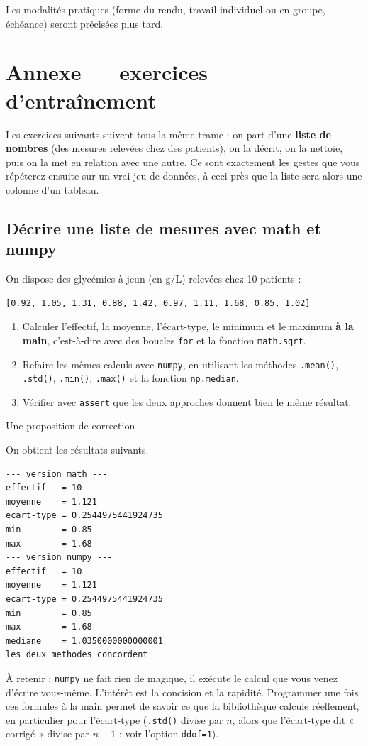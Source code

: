\documentclass[a4paper,12pt]{article}
\begin{document}
\begin{leftbar}
Les modalités pratiques (forme du rendu, travail individuel ou en groupe, échéance) seront précisées plus tard.
\end{leftbar}

\clearpage
\section{Annexe --- exercices d'entraînement}
Les exercices suivants suivent tous la même trame : on part d'une \textbf{liste de nombres} (des mesures relevées chez des patients), on la décrit, on la nettoie, puis on la met en relation avec une autre. Ce sont exactement les gestes que vous répéterez ensuite sur un vrai jeu de données, à ceci près que la liste sera alors une colonne d'un tableau.

\subsection{Décrire une liste de mesures avec math et numpy}
\begin{leftbar}
On dispose des glycémies à jeun (en g/L) relevées chez 10 patients :
\begin{verbatim}
[0.92, 1.05, 1.31, 0.88, 1.42, 0.97, 1.11, 1.68, 0.85, 1.02]
\end{verbatim}
\begin{enumerate}
\item Calculer l'effectif, la moyenne, l'écart-type, le minimum et le maximum \textbf{à la main}, c'est-à-dire avec des boucles \texttt{for} et la fonction \texttt{math.sqrt}.
\item Refaire les mêmes calculs avec \texttt{numpy}, en utilisant les méthodes \texttt{.mean()}, \texttt{.std()}, \texttt{.min()}, \texttt{.max()} et la fonction \texttt{np.median}.
\item Vérifier avec \texttt{assert} que les deux approches donnent bien le même résultat.
\end{enumerate}
\end{leftbar}
Une proposition de correction

On obtient les résultats suivants.
\begin{verbatim}
--- version math ---
effectif   = 10
moyenne    = 1.121
ecart-type = 0.2544975441924735
min        = 0.85
max        = 1.68
--- version numpy ---
effectif   = 10
moyenne    = 1.121
ecart-type = 0.2544975441924735
min        = 0.85
max        = 1.68
mediane    = 1.0350000000000001
les deux methodes concordent
\end{verbatim}
\begin{leftbar}
À retenir : \texttt{numpy} ne fait rien de magique, il exécute le calcul que vous venez d'écrire vous-même. L'intérêt est la concision et la rapidité. Programmer une fois ces formules à la main permet de savoir ce que la bibliothèque calcule réellement, en particulier pour l'écart-type (\texttt{.std()} divise par $n$, alors que l'écart-type dit « corrigé » divise par $n-1$ : voir l'option \texttt{ddof=1}).
\end{leftbar}
\end{document}
